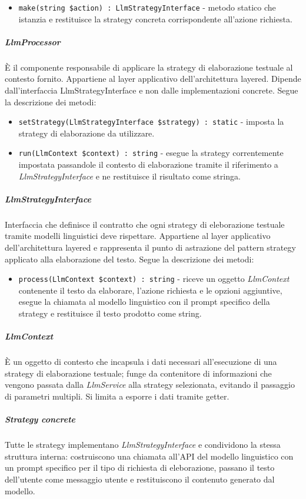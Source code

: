 \documentclass[a4paper,10pt]{article}
\begin{document}
\begin{itemize}
    \item \texttt{make(string \$action) : LlmStrategyInterface} - metodo statico che istanzia e restituisce la strategy concreta corrispondente all'azione richiesta.
\end{itemize}
\subparagraph{LlmProcessor} È il componente responsabile di applicare la strategy di elaborazione testuale al contesto fornito. Appartiene al layer applicativo dell'architettura layered. Dipende dall'interfaccia LlmStrategyInterface e non dalle implementazioni concrete. Segue la descrizione dei metodi:
\begin{itemize}
    \item \texttt{setStrategy(LlmStrategyInterface \$strategy) : static} - imposta la strategy di elaborazione da utilizzare.
    \item \texttt{run(LlmContext \$context) : string} - esegue la strategy correntemente impostata passandole il contesto di elaborazione tramite il riferimento a \textit{LlmStrategyInterface} e ne restituisce il risultato come stringa.
\end{itemize}
\subparagraph{LlmStrategyInterface} Interfaccia che definisce il contratto che ogni strategy di eleborazione testuale tramite modelli linguistici deve rispettare. Appartiene al layer applicativo dell'architettura layered e rappresenta il punto di astrazione del pattern strategy applicato alla elaborazione del testo. Segue la descrizione dei metodi: 
\begin{itemize}
    \item \texttt{process(LlmContext \$context) : string} - riceve un oggetto \textit{LlmContext} contenente il testo da elaborare, l'azione richiesta e le opzioni aggiuntive, esegue la chiamata al modello linguistico con il prompt specifico della strategy e restituisce il testo prodotto come string.
\end{itemize}
\subparagraph{LlmContext} È un oggetto di contesto che incapsula i dati necessari all'esecuzione di una strategy di elaborazione testuale; funge da contenitore di informazioni che vengono passata dalla \textit{LlmService} alla strategy selezionata, evitando il passaggio di parametri multipli. Si limita a esporre i dati tramite getter.
\subparagraph{Strategy concrete}
Tutte le strategy implementano \textit{LlmStrategyInterface} e condividono la stessa struttura interna: costruiscono una chiamata all'API del modello linguistico con un prompt specifico per il tipo di richiesta di eleborazione, passano il testo dell'utente come messaggio utente e restituiscono il contenuto generato dal modello. 
\end{document}
